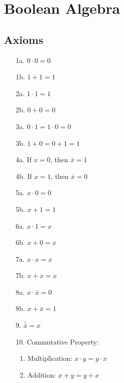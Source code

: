 \documentclass[12pt,openany]{book}
\begin{document}
			      	\newpage
			      	
			      	
			      	\section{Boolean Algebra}
			      	      
			      	\subsection{Axioms}
			      	\begin{multicols}{2} %
			      		\begin{enumerate}
			      			\item[1a.] $0 \cdot 0 = 0$
			      			\item[1b.] $1 + 1 = 1$
			      			\item[2a.] $1 \cdot 1 = 1$
			      			\item[2b.] $0 + 0 = 0$
			      			\item[3a.] $0 \cdot 1 = 1 \cdot 0 = 0$
			      			\item[3b.] $1 + 0 = 0 + 1 = 1$
			      			\item[4a.] If $x = 0$, then $\bar{x} = 1$
			      			\item[4b.] If $x = 1$, then $\bar{x} = 0$
			      			\item[5a.] $x \cdot 0 = 0$
			      			\item[5b.] $x + 1 = 1$
			      			\item[6a.] $x \cdot 1 = x$
			      			\item[6b.] $x + 0 = x$
			      			\item[7a.] $x \cdot x = x$
			      			\item[7b.] $x + x = x$
			      			\item[8a.] $x \cdot \bar{x} = 0$
			      			\item[8b.] $x + \bar{x} = 1$
			      			\item[9.] $\bar{\bar{x}} = x$
			      			\item[10.] Commutative Property:
			      			      \begin{enumerate}
			      			      	\item Multiplication: \( x \cdot y = y \cdot x \)
			      			      	\item Addition: \( x + y = y + x \)
			      			      \end{enumerate}
                            \vspace*{60px} 

\end{enumerate}
\end{multicols}
\end{document}
